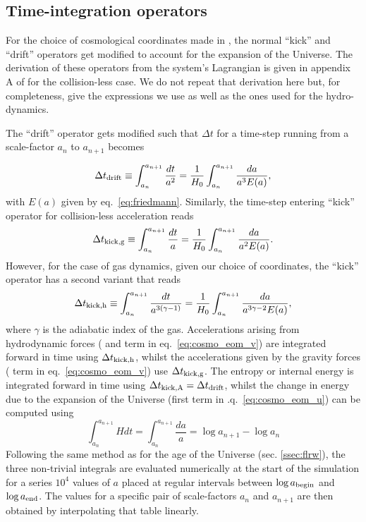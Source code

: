 \subsection{Time-integration operators}
\label{ssec:operators}
For the choice of cosmological coordinates made in \swift, the normal
``kick'' and ``drift'' operators get modified to account for the
expansion of the Universe. The derivation of these operators from the
system's Lagrangian is given in appendix A of \cite{Quinn1997} for the
collision-less case. We do not repeat that derivation here but, for
completeness, give the expressions we use as well as the ones used for
the hydro-dynamics. 

The ``drift'' operator gets modified such that $\Delta t$ for a
time-step running from a scale-factor $a_{n}$ to $a_{n+1}$ becomes

\begin{equation}
  \Delta t_{\rm drift} \equiv \int_{a_n}^{a_{n+1}} \frac{dt}{a^2} = \frac{1}{H_0} \int_{a_n}^{a_{n+1}} \frac{da}{a^3E(a)},
\end{equation}
with $E(a)$ given by eq.~\ref{eq:friedmann}. Similarly, the time-step
entering ``kick'' operator for collision-less acceleration reads
\begin{equation}
  \Delta t_{\rm kick,g} \equiv \int_{a_n}^{a_{n+1}} \frac{dt}{a} = \frac{1}{H_0} \int_{a_n}^{a_{n+1}} \frac{da}{a^2E(a)}.
\end{equation}
However, for the case of gas dynamics, given our choice of
coordinates, the ``kick'' operator has a second variant that reads
\begin{equation}
  \Delta t_{\rm kick,h} \equiv \int_{a_n}^{a_{n+1}} \frac{dt}{a^{3(\gamma-1)}} = \frac{1}{H_0} \int_{a_n}^{a_{n+1}} \frac{da}{a^{3\gamma - 2}E(a)},
\end{equation}
where $\gamma$ is the adiabatic index of the gas.  Accelerations
arising from hydrodynamic forces ( and  term in
eq.~\ref{eq:cosmo_eom_v}) are integrated forward in time using $\Delta
t_{\rm kick,h}$, whilst the accelerations given by the gravity forces
( term in eq.~\ref{eq:cosmo_eom_v}) use $\Delta t_{\rm
  kick,g}$. The entropy or internal energy is integrated forward in
time using $\Delta t_{\rm kick,A} = \Delta t_{\rm drift}$, whilst the
change in energy due to the expansion of the Universe (first term in
.q.~\ref{eq:cosmo_eom_u}) can be computed using
\begin{equation}
  \int_{a_n}^{a_{n+1}} H dt = \int_{a_n}^{a_{n+1}} \frac{da}{a} =
  \log{a_{n+1}} - \log{a_n}
\end{equation}
Following the same method as for the age of the Universe
(sec. \ref{ssec:flrw}), the three non-trivial integrals are evaluated
numerically at the start of the simulation for a series $10^4$ values
of $a$ placed at regular intervals between $\log a_{\rm begin}$ and
$\log a_{\rm end}$. The values for a specific pair of scale-factors
$a_n$ and $a_{n+1}$ are then obtained by interpolating that table
linearly.


